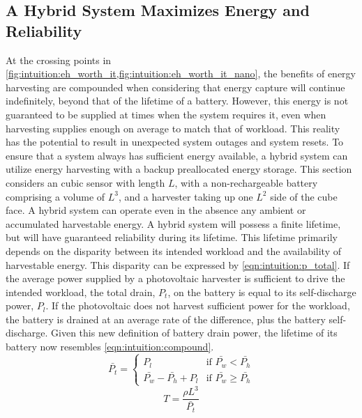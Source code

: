 
\subsection{A Hybrid System Maximizes Energy and Reliability}
\label{sec:intuition:hybrid}
At the crossing points in \cref{fig:intuition:eh_worth_it,fig:intuition:eh_worth_it_nano}, the benefits of energy harvesting are compounded when considering that energy capture will continue indefinitely, beyond that of the lifetime of a battery.
However, this energy is not guaranteed to be supplied at times when the system requires it, even when harvesting supplies enough on average to match that of workload. This reality has the potential to result in unexpected system outages and system resets.
To ensure that a system always has sufficient energy available, a hybrid system can utilize energy harvesting with a backup preallocated energy storage. 
This section considers an cubic sensor with length $L$, with a non-rechargeable battery comprising a volume of $L^3$, and a harvester taking up one $L^2$ side of the cube face.
A hybrid system can operate even in the absence any ambient or accumulated harvestable energy. A hybrid system will possess a finite lifetime, but will have guaranteed reliability during its lifetime. 
This lifetime primarily depends on the disparity between its intended workload and the availability of harvestable energy.
This disparity can be expressed by \cref{eqn:intuition:p_total}. 
If the average power supplied by a photovoltaic harvester is sufficient to drive the intended workload, the total drain, $P_t$, on the battery is equal to its self-discharge power, $P_l$. 
If the photovoltaic does not harvest sufficient power for the workload, the battery is drained at an average rate of the difference, plus the battery self-discharge.
Given this new definition of battery drain power, the lifetime of its battery now resembles \cref{eqn:intuition:compound}.
\begin{equation} \label{eqn:intuition:p_total}
    \bar{P_t} = 
    \begin{cases}
        P_l & \text{if $\bar{P_w} < \bar{P_h}$} \\
        \bar{P_w} - \bar{P_h} + P_l & \text{if $\bar{P_w} \geq \bar{P_h}$}
    \end{cases}
\end{equation}
\begin{equation} \label{eqn:intuition:compound}
T = \frac{\rho L^3}{\bar{P_t}}
\end{equation}
